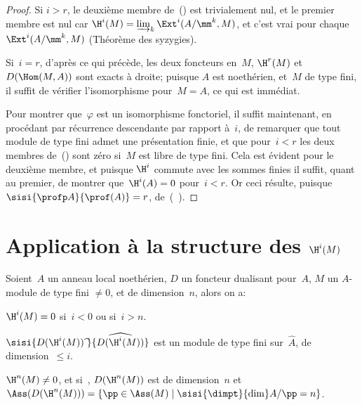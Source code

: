 \begin{proof}
Si $i>r$\pageoriginale, le deuxi\`eme membre de~() est trivialement nul, et le premier membre est nul car $\H^{i}(M)=\varinjlim_{k}\Ext^{i}(A/\mm^{k}, M)$, et c'est vrai pour chaque $\Ext^{i}(A/\mm^{k}, M)$ (Th\'eor\`eme des syzygies).

Si~$i=r$, d'apr\`es ce qui pr\'ec\`ede, les deux foncteurs en~$M$, $\H^{r}(M)$ et~$D(\Hom(M, A))$ sont exacts \`a droite; puisque $A$ est noeth\'erien, et~$M$ de type fini, il suffit de v\'erifier l'isomorphisme pour~$M=A$, ce qui est imm\'ediat.

Pour montrer que~$\varphi$ est un isomorphisme fonctoriel, il suffit maintenant, en proc\'edant par r\'ecurrence descendante par rapport \`a~$i$, de remarquer que tout module de type fini admet une pr\'esentation finie, et que pour~$i<r$ les deux membres de~() sont z\'ero si~$M$ est libre de type fini. Cela est \'evident pour le deuxi\`eme membre, et puisque $\H^{i}$ commute avec les sommes finies il suffit, quant au premier, de montrer que~$\H^{i}(A)=0$ pour~$i<r$. Or ceci r\'esulte, puisque $\sisi{\profp A}{\prof(A)}=r$, de~(~).
\skipqed
\end{proof}

\section{Application \`a la structure des $\H^i(M)$} \label{V.3}

\setcounter{equation}{14}

\begin{theoreme} \label{V.3.1} Soient~$A$ un anneau local noeth\'erien, $D$ un foncteur dualisant pour~$A$, $M$ un $A$-module de type fini $\neq 0$, et de dimension~$n$, alors on a:
\begin{enumeratei}
\item
$\H^{i}(M)=0$ si~$i<0$ ou si~$i>n$.
\item
$\sisi{D(\H^{i}(M))\;\widehat{\hbox{}}}{\widehat{D(\H^{i}(M))}}$ est un module de type fini sur~$\widehat{A}$, de dimension~$\leq i$.
\item
$\H^{n}(M)\neq 0$, et si~, $D(\H^{n}(M))$ est de dimension~$n$ et $\Ass(D(\H^{n}(M)))=\{ \pp\in\Ass(M) \mid \sisi{\dimpt}{\dim} A/\pp=n\}$.
\end{enumeratei}
\end{theoreme}

